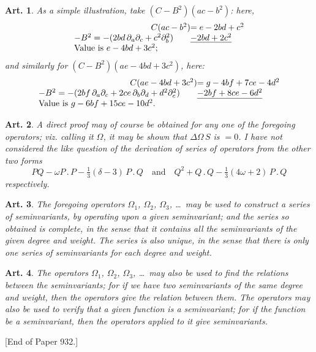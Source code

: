 \documentclass[11pt,a4paper]{article}
\theoremstyle{cayley}
\newtheorem{art}{Art.}[section]
\begin{document}
\setcounter{art}{79}
\begin{art}
As a simple illustration, take $(C - B^{2})(ac - b^{2})$: here,
\[
\begin{array}{r@{}l}
C(ac - b^{2}) &= e - 2bd + c^{2} \\
-B^{2} = -(2bd\,\partial_{a}\partial_{c} + c^{2}\partial_{b}^{2})\qquad & \underline{-2bd + 2c^{2}} \\
\multicolumn{2}{l}{\text{Value is } e - 4bd + 3c^{2};}
\end{array}
\]
and similarly for $(C - B^{2})(ae - 4bd + 3c^{2})$, here:
\[
\begin{array}{r@{}l}
C(ae - 4bd + 3c^{2}) &= g - 4bf + 7ce - 4d^{2} \\
-B^{2} = -(2bf\,\partial_{a}\partial_{c} + 2ce\,\partial_{b}\partial_{d} + d^{2}\partial_{c}^{2})\qquad & \underline{-2bf + 8ce - 6d^{2}} \\
\multicolumn{2}{l}{\text{Value is } g - 6bf + 15ce - 10d^{2}.}
\end{array}
\]
\end{art}

\setcounter{art}{80}
\begin{art}
A direct proof may of course be obtained for any one of the foregoing operators; viz. calling it $\Omega$, it may be shown that $\Delta\Omega\,S$ is $= 0$. I have not considered the like question of the derivation of series of operators from the other two forms
\[
PQ - \omega P\,.\,P - \tfrac{1}{3}(\delta - 3)\,P\,.\,Q \quad \text{and} \quad Q^{2} + Q\,.\,Q - \tfrac{1}{3}(4\omega + 2)\,P\,.\,Q
\]
respectively.
\end{art}

\setcounter{art}{81}
\begin{art}
The foregoing operators $\Omega_{1}$, $\Omega_{2}$, $\Omega_{3}$, \ldots\ may be used to construct a series of seminvariants, by operating upon a given seminvariant; and the series so obtained is complete, in the sense that it contains all the seminvariants of the given degree and weight. The series is also unique, in the sense that there is only one series of seminvariants for each degree and weight.
\end{art}

\setcounter{art}{82}
\begin{art}
The operators $\Omega_{1}$, $\Omega_{2}$, $\Omega_{3}$, \ldots\ may also be used to find the relations between the seminvariants; for if we have two seminvariants of the same degree and weight, then the operators give the relation between them. The operators may also be used to verify that a given function is a seminvariant; for if the function be a seminvariant, then the operators applied to it give seminvariants.
\end{art}

\vspace{1cm}
\begin{center}
[End of Paper 932.]
\end{center}
\end{document}
